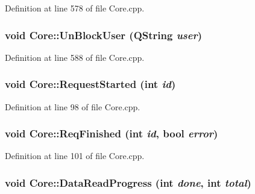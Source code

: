 Definition at line 578 of file Core.cpp.\hypertarget{classCore_abc783553ec1e543435b8dc06f64939f}{
\subsubsection{\setlength{\rightskip}{0pt plus 5cm}void Core::UnBlockUser (QString {\em user})}}
\label{classCore_abc783553ec1e543435b8dc06f64939f}




Definition at line 588 of file Core.cpp.\hypertarget{classCore_2e3b63ac22f8fef5f2d2d5e9adc42cdd}{
\subsubsection{\setlength{\rightskip}{0pt plus 5cm}void Core::RequestStarted (int {\em id})}}
\label{classCore_2e3b63ac22f8fef5f2d2d5e9adc42cdd}




Definition at line 98 of file Core.cpp.\hypertarget{classCore_7b649f8d3aeae37e3f2e0eff65ab189f}{
\subsubsection{\setlength{\rightskip}{0pt plus 5cm}void Core::ReqFinished (int {\em id}, \/  bool {\em error})}}
\label{classCore_7b649f8d3aeae37e3f2e0eff65ab189f}




Definition at line 101 of file Core.cpp.\hypertarget{classCore_77844f4e1b5e81ff4a13bc22328a4258}{
\subsubsection{\setlength{\rightskip}{0pt plus 5cm}void Core::DataReadProgress (int {\em done}, \/  int {\em total})}}
\label{classCore_77844f4e1b5e81ff4a13bc22328a4258}




